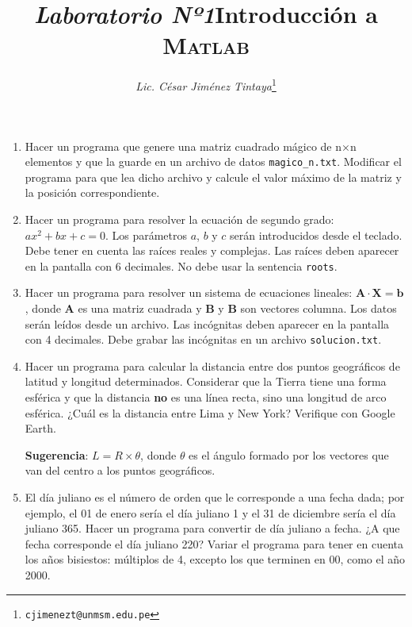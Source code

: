 \documentclass[a4paper,12pt,twoside,final]{article}
\begin{document}
    \title{\textit{\Large Laboratorio Nº1}\linebreak{}\linebreak{}\textbf{\Huge Introducción a \textsc{Matlab}}}
    \author{\emph{Lic. César Jiménez Tintaya}\footnote{\texttt{cjimenezt@unmsm.edu.pe}}}
    \date{}
    \maketitle


    \begin{enumerate}
        \item Hacer un programa que genere una matriz cuadrado mágico de n×n elementos
        y que la guarde en un archivo de datos \texttt{magico\_n.txt}. Modificar el
        programa para que lea dicho archivo y calcule el valor máximo de la matriz
        y la posición correspondiente.

        \item Hacer un programa para resolver la ecuación de segundo grado:
        $ax^2+bx+c=0$. Los parámetros $a$, $b$ y $c$ serán introducidos desde
        el teclado. Debe tener en cuenta las raíces reales y complejas. Las
        raíces deben aparecer en la pantalla con 6 decimales. No debe usar la
        sentencia \texttt{roots}.

        \item Hacer un programa para resolver un sistema de ecuaciones
        lineales: $\mathbf{A}\cdot\mathbf{X}=\mathbf{b}$, donde $\mathbf{A}$ es
        una matriz cuadrada y $\mathbf{B}$ y $\mathbf{B}$ son vectores columna.
        Los datos serán leídos desde un archivo. Las incógnitas deben aparecer
        en la pantalla con 4 decimales. Debe grabar las incógnitas en un
        archivo \texttt{solucion.txt}.

        \item Hacer un programa para calcular la distancia entre dos puntos
        geográficos de latitud y longitud determinados. Considerar que la
        Tierra tiene una forma esférica y que la distancia \textbf{no} es una
        línea recta, sino una longitud de arco esférica. ¿Cuál es la distancia
        entre Lima y New York? Verifique con Google Earth.

        \textbf{Sugerencia}: $L=R\times\theta$, donde $\theta$ es el ángulo
        formado por los vectores que van del centro a los puntos geográficos.

        \item El día juliano es el número de orden que le corresponde a una
        fecha dada; por ejemplo, el 01 de enero sería el día juliano 1 y el 31
        de diciembre sería el día juliano 365. Hacer un programa para
        convertir de día juliano a fecha. ¿A que fecha corresponde el día
        juliano 220? Variar el programa para tener en cuenta los años
        bisiestos: múltiplos de 4, excepto los que terminen en 00, como el
        año 2000.


\end{enumerate}
\end{document}
